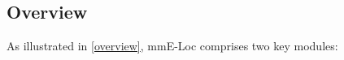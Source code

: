 

\vspace{-0.3cm}
\subsection{Overview}
As illustrated in \fig \ref{overview}, mmE-Loc comprises two key modules: 

